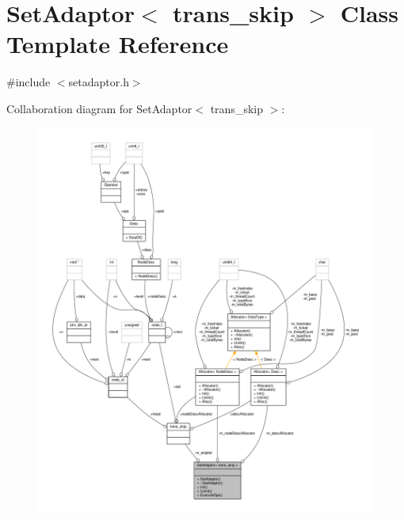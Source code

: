 \hypertarget{classSetAdaptor_3_01trans__skip_01_4}{\section{Set\-Adaptor$<$ trans\-\_\-skip $>$ Class Template Reference}
\label{classSetAdaptor_3_01trans__skip_01_4}
}


{\ttfamily \#include $<$setadaptor.\-h$>$}



Collaboration diagram for Set\-Adaptor$<$ trans\-\_\-skip $>$\-:
\nopagebreak
\begin{figure}[H]
\begin{center}
\leavevmode
\includegraphics[width=350pt]{classSetAdaptor_3_01trans__skip_01_4__coll__graph}
\end{center}
\end{figure}

